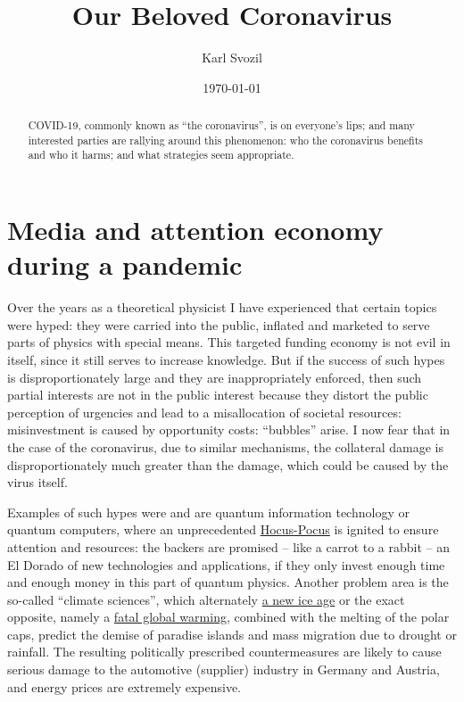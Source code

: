 \documentclass[%
 reprint,
 showpacs,
 showkeys,
 preprintnumbers,
 amsmath,amssymb,
 aps,
  pra,
  longbibliography,
 floatfix,
 ]{revtex4-1}
\begin{document}
\title{Our Beloved Coronavirus}


\author{Karl Svozil}



\date{\today}

\begin{abstract}
COVID-19, commonly known as ``the coronavirus'', is on everyone's lips; and many interested parties are rallying around this phenomenon:
who the coronavirus benefits and who it harms; and what strategies seem appropriate.\end{abstract}


\maketitle

\section{Media and attention economy during a pandemic}

Over the years as a theoretical physicist I have experienced that certain topics were hyped: they were carried into the public, inflated and
marketed to serve parts of physics with special means.
This targeted funding economy is not evil in itself, since it still serves to increase knowledge.
But if the success of such hypes is disproportionately large and they are inappropriately enforced, then
such partial interests are not in the public interest because they distort the public perception of urgencies
and   lead  to a misallocation of societal resources: misinvestment is caused by opportunity costs: ``bubbles'' arise.
I now fear that in the case of the coronavirus, due to similar mechanisms, the collateral damage is disproportionately much greater than the damage,
which could be caused by the virus itself.

Examples of such hypes were and are quantum information technology or quantum computers, where an unprecedented
\href{http://doi.org/10.3354/esep00171}{Hocus-Pocus} is ignited to ensure attention and resources:
the backers are promised -- like a carrot to a rabbit -- an El Dorado of new technologies and applications,
if they only invest enough time and enough money in this part of quantum physics.
Another problem area is the so-called ``climate sciences'', which alternately \href{https://doi.org/10.1126/science.173.3992.138}{a new ice age}
or the exact opposite, namely a \href{https://drive.google.com/file/d/1p_chp9vO0nefV9976q-C_MWTxdqmBCaJ/view}{fatal global warming},
combined with the melting of the polar caps,
predict the demise of paradise islands and mass migration due to drought or rainfall.
The resulting politically prescribed countermeasures are likely to cause serious damage to the automotive (supplier) industry in Germany and Austria,
and energy prices are extremely expensive.
\end{document}
